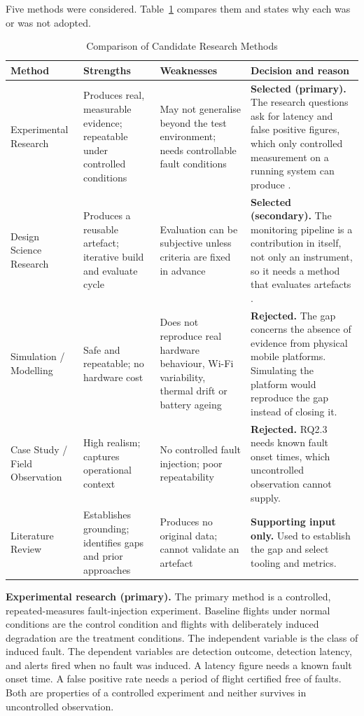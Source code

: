 Five methods were considered. Table~\ref{tab:methods} compares them and states
why each was or was not adopted.

\begin{table}[htbp]
\centering
\caption{Comparison of Candidate Research Methods}
\label{tab:methods}
\footnotesize
\begin{tabular}{|p{2.4cm}|p{3.4cm}|p{3.4cm}|p{4.6cm}|}
\hline
\textbf{Method} & \textbf{Strengths} & \textbf{Weaknesses} & \textbf{Decision and reason} \\
\hline
Experimental Research \citep{wohlin2012} & Produces real, measurable evidence; repeatable under controlled conditions & May not generalise beyond the test environment; needs controllable fault conditions & \textbf{Selected (primary).} The research questions ask for latency and false positive figures, which only controlled measurement on a running system can produce \citep{yousuf2024, paradeshi2022}. \\
\hline
Design Science Research \citep{hevner2004} & Produces a reusable artefact; iterative build and evaluate cycle & Evaluation can be subjective unless criteria are fixed in advance & \textbf{Selected (secondary).} The monitoring pipeline is a contribution in itself, not only an instrument, so it needs a method that evaluates artefacts \citep{boncea2016}. \\
\hline
Simulation / Modelling & Safe and repeatable; no hardware cost & Does not reproduce real hardware behaviour, Wi-Fi variability, thermal drift or battery ageing & \textbf{Rejected.} The gap concerns the absence of evidence from physical mobile platforms. Simulating the platform would reproduce the gap instead of closing it. \\
\hline
Case Study / Field Observation & High realism; captures operational context & No controlled fault injection; poor repeatability & \textbf{Rejected.} RQ2.3 needs known fault onset times, which uncontrolled observation cannot supply. \\
\hline
Literature Review & Establishes grounding; identifies gaps and prior approaches & Produces no original data; cannot validate an artefact & \textbf{Supporting input only.} Used to establish the gap and select tooling and metrics. \\
\hline
\end{tabular}
\end{table}

\noindent\textbf{Experimental research (primary).} The primary method is a
controlled, repeated-measures fault-injection experiment. Baseline flights under
normal conditions are the control condition and flights with deliberately induced
degradation are the treatment conditions. The independent variable is the class
of induced fault. The dependent variables are detection outcome, detection
latency, and alerts fired when no fault was induced. A latency figure needs a
known fault onset time. A false positive rate needs a period of flight certified
free of faults. Both are properties of a controlled experiment and neither
survives in uncontrolled observation.

